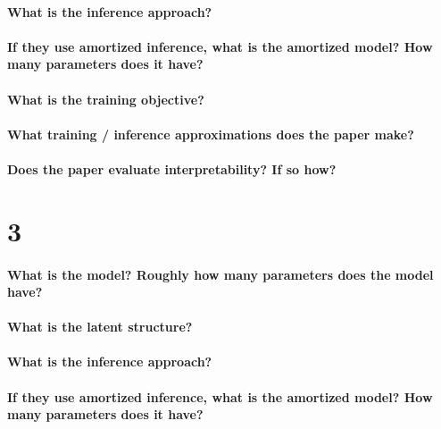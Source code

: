 \documentclass[11pt]{article}
\begin{document}
\paragraph{What is the inference approach?}

\paragraph{If they use amortized inference, what is the amortized model? How many parameters does it have?}

\paragraph{What is the training objective?}

\paragraph{What training / inference approximations does the paper make?}

\paragraph{Does the paper evaluate interpretability? If so how?}

\section{3}

\paragraph{What is the model? Roughly how many parameters does the model have?}

\paragraph{What is the latent structure?}

\paragraph{What is the inference approach?}

\paragraph{If they use amortized inference, what is the amortized model? How many parameters does it have?}
\end{document}
